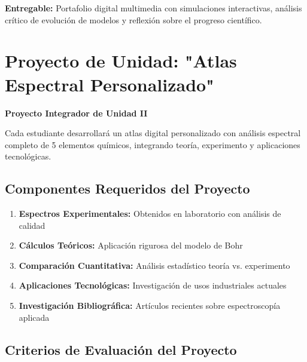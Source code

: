 \begin{tecnologiabox}
\begin{tecnologiabox}
\begin{tecnologiabox}
\begin{teknologiabox}
\begin{practicabox}
\textbf{Entregable:} Portafolio digital multimedia con simulaciones interactivas, análisis crítico de evolución de modelos y reflexión sobre el progreso científico.
\end{practicabox}

\section{Proyecto de Unidad: "Atlas Espectral Personalizado"}

\begin{objetivobox}
\textbf{Proyecto Integrador de Unidad II}

Cada estudiante desarrollará un atlas digital personalizado con análisis espectral completo de 5 elementos químicos, integrando teoría, experimento y aplicaciones tecnológicas.
\end{objetivobox}

\subsection{Componentes Requeridos del Proyecto}

\begin{enumerate}
\item \textbf{Espectros Experimentales:} Obtenidos en laboratorio con análisis de calidad
\item \textbf{Cálculos Teóricos:} Aplicación rigurosa del modelo de Bohr
\item \textbf{Comparación Cuantitativa:} Análisis estadístico teoría vs. experimento
\item \textbf{Aplicaciones Tecnológicas:} Investigación de usos industriales actuales
\item \textbf{Investigación Bibliográfica:} Artículos recientes sobre espectroscopía aplicada
\end{enumerate}

\subsection{Criterios de Evaluación del Proyecto}


\end{teknologiabox}
\end{tecnologiabox}
\end{tecnologiabox}
\end{tecnologiabox}
